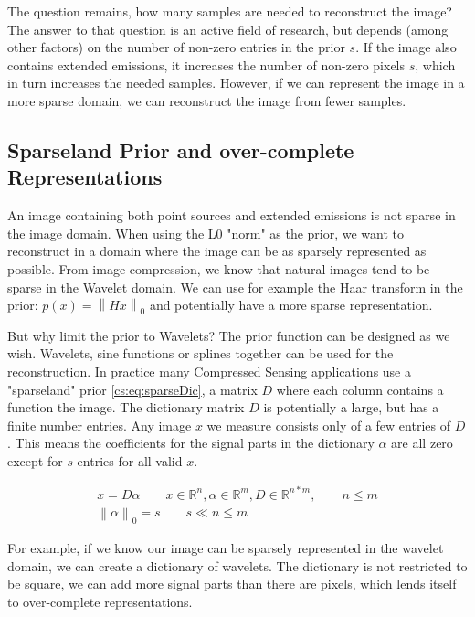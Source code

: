 The question remains, how many samples are needed to reconstruct the image? The answer to that question is an active field of research\cite{candes2011probabilistic}, but depends (among other factors) on the number of non-zero entries in the prior $s$. If the image also contains extended emissions, it increases the number of non-zero pixels $s$, which in turn increases the needed samples. However, if we can represent the image in a more sparse domain, we can reconstruct the image from fewer samples.


\subsection{Sparseland Prior and over-complete Representations}
An image containing both point sources and extended emissions is not sparse in the image domain. When using the L0 "norm" as the prior, we want to reconstruct in a domain where the image can be as sparsely represented as possible. From image compression, we know that natural images tend to be sparse in the Wavelet domain. We can use for example the Haar transform in the prior: $p(x) = \left \| Hx \right \|_0$ and potentially have a more sparse representation.

But why limit the prior to Wavelets? The prior function can be designed as we wish. Wavelets, sine functions or splines together can be used for the reconstruction. In practice many Compressed Sensing applications use a "sparseland" prior \eqref{cs:eq:sparseDic}, a matrix $D$ where each column contains a function the image. The dictionary matrix $D$ is potentially a large, but has a finite number entries. Any image $x$ we measure consists only of a few entries of $D$. This means the coefficients for the signal parts in the dictionary $\alpha$ are all zero except for $s$ entries for all valid $x$.

\begin{equation} \label{cs:eq:sparseDic}
\begin{split}
x = D \alpha  \qquad  x \in \mathbb{R}^{n}, \alpha \in \mathbb{R}^{m}, D \in \mathbb{R}^{n*m}, \qquad n \leq m \\
\left \| \alpha \right \|_0 = s \qquad s \ll n \leq m
\end{split}
\end{equation}


For example, if we know our image can be sparsely represented in the wavelet domain, we can create a dictionary of wavelets. The dictionary is not restricted to be square, we can add more signal parts than there are pixels, which lends itself to over-complete representations.


